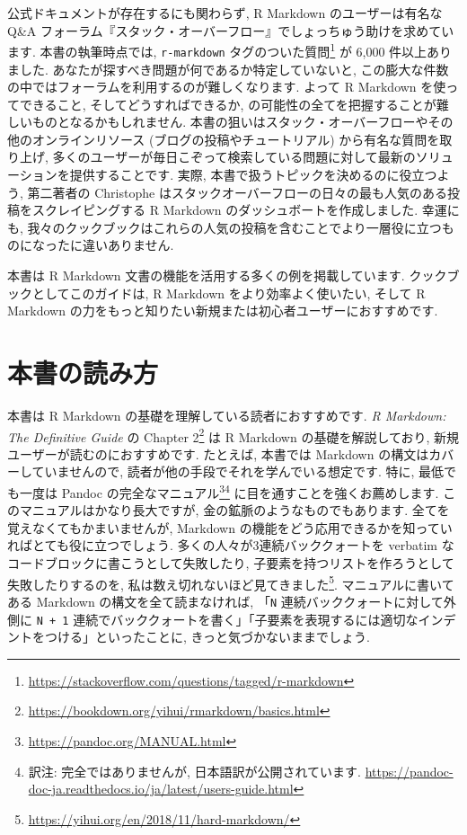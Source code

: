 \documentclass[
  11pt,
  lualatex,ja=standard,jafont=noto]{bxjsreport}
\renewcommand{\href}[2]{#2\footnote{\url{#1}}}
\begin{document}
公式ドキュメントが存在するにも関わらず, R Markdown のユーザーは有名な Q\&A フォーラム『スタック・オーバーフロー』でしょっちゅう助けを求めています. 本書の執筆時点では, \href{https://stackoverflow.com/questions/tagged/r-markdown}{\texttt{r-markdown} タグのついた質問} が 6,000 件以上ありました. あなたが探すべき問題が何であるか特定していないと, この膨大な件数の中ではフォーラムを利用するのが難しくなります. よって R Markdown を使ってできること, そしてどうすればできるか, の可能性の全てを把握することが難しいものとなるかもしれません. 本書の狙いはスタック・オーバーフローやその他のオンラインリソース (ブログの投稿やチュートリアル) から有名な質問を取り上げ, 多くのユーザーが毎日こぞって検索している問題に対して最新のソリューションを提供することです. 実際, 本書で扱うトピックを決めるのに役立つよう, 第二著者の Christophe はスタックオーバーフローの日々の最も人気のある投稿をスクレイピングする R Markdown のダッシュボートを作成しました. 幸運にも, 我々のクックブックはこれらの人気の投稿を含むことでより一層役に立つものになったに違いありません.

本書は R Markdown 文書の機能を活用する多くの例を掲載しています. クックブックとしてこのガイドは, R Markdown をより効率よく使いたい, そして R Markdown の力をもっと知りたい新規または初心者ユーザーにおすすめです.

\hypertarget{How-to-read-this-book}{%
\section*{本書の読み方}\label{How-to-read-this-book}}

本書は R Markdown の基礎を理解している読者におすすめです. \emph{R Markdown: The Definitive Guide} \autocite{rmarkdown2018} の \href{https://bookdown.org/yihui/rmarkdown/basics.html}{Chapter 2} は R Markdown の基礎を解説しており, 新規ユーザーが読むのにおすすめです. たとえば, 本書では Markdown の構文はカバーしていませんので, 読者が他の手段でそれを学んでいる想定です. 特に, 最低でも一度は \href{https://pandoc.org/MANUAL.html}{Pandoc の完全なマニュアル}\footnote{訳注: 完全ではありませんが, 日本語訳が公開されています. \url{https://pandoc-doc-ja.readthedocs.io/ja/latest/users-guide.html}} に目を通すことを強くお薦めします. このマニュアルはかなり長大ですが, 金の鉱脈のようなものでもあります. 全てを覚えなくてもかまいませんが, Markdown の機能をどう応用できるかを知っていればとても役に立つでしょう. 多くの人々が3連続バッククォートを verbatim なコードブロックに書こうとして失敗したり, 子要素を持つリストを作ろうとして失敗したりするのを, \href{https://yihui.org/en/2018/11/hard-markdown/}{私は数え切れないほど見てきました}. マニュアルに書いてある Markdown の構文を全て読まなければ, 「\texttt{N} 連続バッククォートに対して外側に \texttt{N + 1} 連続でバッククォートを書く」「子要素を表現するには適切なインデントをつける」といったことに, きっと気づかないままでしょう.
\end{document}
